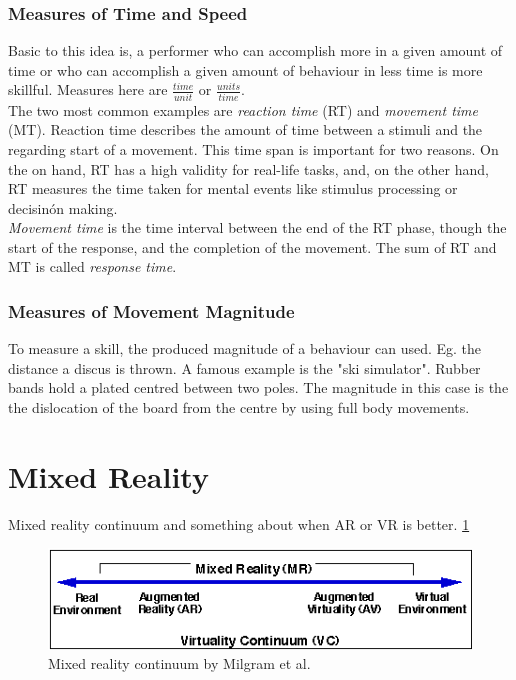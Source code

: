 \subsubsection{Measures of Time and Speed}
Basic to this idea is, a performer who can accomplish more in a given amount of time or who can accomplish a given amount of behaviour in less time is  more skillful. Measures here are
$\frac{time}{unit}$ or $\frac{units}{time}$.\\
The two most common examples are \textit{reaction time} (RT) and \textit{movement time} (MT). Reaction time describes the amount of time between a stimuli and the regarding start of a movement. This time span is important for two reasons. On the on hand, RT has a high validity for real-life tasks, and, on the other hand, RT measures the time taken for mental events like stimulus processing or decisinón making.\\
\textit{Movement time} is the time interval between the end of the RT phase, though the start of the response, and the completion of the movement. The sum of RT and MT is called \textit{response time}.

\subsubsection{Measures of Movement Magnitude}
To measure a skill, the produced magnitude of a behaviour can used. Eg. the distance a discus is thrown. A famous example is the "ski simulator". Rubber bands hold a plated centred between two poles. The magnitude in this case is the the dislocation of the board from the centre by using full body movements.

\section{Mixed Reality}
Mixed reality continuum \cite{Milgram1994} and something about when AR or VR is better. \ref{fig:MRcont} \todo 

\begin{figure}
	\centering
	\includegraphics[width=1.0\textwidth]{img/milgram_continuum.png}
	\caption{Mixed reality continuum by Milgram et al. \cite{Milgram1994}}
	\label{fig:MRcont}
\end{figure}


